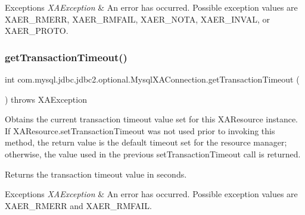 \begin{DoxyExceptions}{Exceptions}
{\em X\+A\+Exception} & An error has occurred. Possible exception values are X\+A\+E\+R\+\_\+\+R\+M\+E\+RR, X\+A\+E\+R\+\_\+\+R\+M\+F\+A\+IL, X\+A\+E\+R\+\_\+\+N\+O\+TA, X\+A\+E\+R\+\_\+\+I\+N\+V\+AL, or X\+A\+E\+R\+\_\+\+P\+R\+O\+TO. \\
\hline
\end{DoxyExceptions}
\mbox{\label{classcom_1_1mysql_1_1jdbc_1_1jdbc2_1_1optional_1_1_mysql_x_a_connection_aa09db65cb5575dd6396924f5967f7f6f}} 
\subsubsection{\texorpdfstring{get\+Transaction\+Timeout()}{getTransactionTimeout()}}
{\footnotesize\ttfamily int com.\+mysql.\+jdbc.\+jdbc2.\+optional.\+Mysql\+X\+A\+Connection.\+get\+Transaction\+Timeout (\begin{DoxyParamCaption}{ }\end{DoxyParamCaption}) throws X\+A\+Exception}

Obtains the current transaction timeout value set for this X\+A\+Resource instance. If X\+A\+Resource.\+set\+Transaction\+Timeout was not used prior to invoking this method, the return value is the default timeout set for the resource manager; otherwise, the value used in the previous set\+Transaction\+Timeout call is returned.

\begin{DoxyReturn}{Returns}
the transaction timeout value in seconds.
\end{DoxyReturn}

\begin{DoxyExceptions}{Exceptions}
{\em X\+A\+Exception} & An error has occurred. Possible exception values are X\+A\+E\+R\+\_\+\+R\+M\+E\+RR and X\+A\+E\+R\+\_\+\+R\+M\+F\+A\+IL. \\
\hline
\end{DoxyExceptions}
\mbox{\label{classcom_1_1mysql_1_1jdbc_1_1jdbc2_1_1optional_1_1_mysql_x_a_connection_a7af72f218de2585effac3636eb6b1cec}} 
